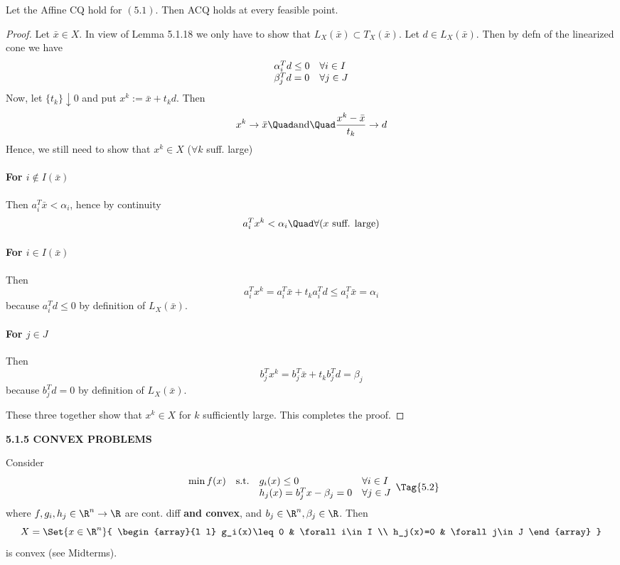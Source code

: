 \label{f5d546e}

Let the Affine CQ hold for $(5.1)$. Then ACQ holds at every feasible point.

\begin{proof}
  \def\LC{L_X(\bar x)}
  \def\TC{T_X(\bar x)}
  \def\Active{I(\bar x)}

  Let $\bar x\in X$. In view of Lemma 5.1.18 we only have to show that
  $\LC\subset\TC$. Let $d\in\LC$. Then by defn of the linearized cone we have
  $$
    \begin{array}{l l}
      \alpha_i^Td\leq0 & \forall i\in I \\
      \beta_j^Td=0     & \forall j\in J
    \end{array}
  $$
  Now, let $\{t_k\}\downarrow0$ and put $x^k:=\bar x+t_kd$. Then
  $$
    x^k\to\bar x \Quad\text{and}\Quad \frac{x^k-\bar x}{t_k}\to d
  $$
  Hence, we still need to show that $x^k\in X$ ($\forall k$ suff.
  large)

  \paragraph{For $i\notin\Active$} Then $a_i^T\bar x<\alpha_i$, hence by continuity
  $$
    a_i^Tx^k<\alpha_i\Quad\forall(x\text{ suff. large})
  $$

  \paragraph{For $i\in\Active$} Then
  $$
    a_i^Tx^k = a_i^T\bar x + t_ka_i^Td \leq a_i^T\bar x = \alpha_i
  $$
  because $a_i^Td\leq0$ by definition of $\LC$.

  \paragraph{For $j\in J$} Then
  $$
    b_j^T x^k=b_j^T\bar x+t_kb_j^Td=\beta_j
  $$
  because $b_j^Td=0$ by definition of $\LC$.

  These three together show that $x^k\in X$ for $k$ sufficiently large. This
  completes the proof.
\end{proof}

\textbf{5.1.5 CONVEX PROBLEMS}

Consider
\begin{equation*}
  \begin{array}{l l l l}
    \min f(x) & \text{s.t.} & g_i(x)\leq0             & \forall i\in I \\
              &             & h_j(x)=b_j^Tx-\beta_j=0 & \forall j\in J
  \end{array}
  \Tag{5.2}
\end{equation*}
where $f,g_i,h_j\in\R^n\to\R$ are cont. diff \textbf{and convex}, and
$b_j\in\R^n,\beta_j\in\R$. Then
$$
  X=\Set{x\in\R^n}{
    \begin{array}{l l}
      g_i(x)\leq0 & \forall i\in I \\
      h_j(x)=0    & \forall j\in J
    \end{array}
  }
$$
is convex (see Midterms).

